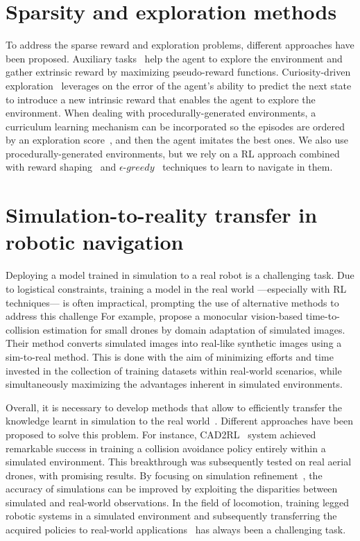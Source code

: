 \section{Sparsity and exploration methods}\label{sec:sparsity-and-exploration-methods}
To address the sparse reward and exploration problems, different approaches have been proposed.
Auxiliary tasks~\cite{jaderberg2016, ye2021} help the agent to explore the environment and gather extrinsic reward by maximizing pseudo-reward functions.
Curiosity-driven exploration~\cite{pathak2017} leverages on the error of the agent's ability to predict the next state to introduce a new intrinsic reward that enables the agent to explore the environment.
When dealing with procedurally-generated environments, a curriculum learning mechanism can be incorporated so the episodes are ordered by an exploration score~\cite{zha2020b}, and then the agent imitates the best ones.
We also use procedurally-generated environments, but we rely on a RL approach combined with reward shaping~\cite{ng1999, jestel2021} and $\epsilon\text{-}greedy$~\cite{mnih2013} techniques to learn to navigate in them.

\section{Simulation-to-reality transfer in robotic navigation}\label{sec:simulation-to-reality-transfer-in-robotic-navigation}
Deploying a model trained in simulation to a real robot is a challenging task.
Due to logistical constraints, training a model in the real world —especially with RL techniques— is often impractical, prompting the use of alternative methods to address this challenge
For example, \cite{kim2022} propose a monocular vision-based time-to-collision estimation for small drones by domain adaptation of simulated images.
Their method converts simulated images into real-like synthetic images using a sim-to-real method.
This is done with the aim of minimizing efforts and time invested in the collection of training datasets within real-world scenarios, while simultaneously maximizing the advantages inherent in simulated environments.

Overall, it is necessary to develop methods that allow to efficiently transfer the knowledge learnt in simulation to the real world~\cite{kadian2020}.
Different approaches have been proposed to solve this problem.
For instance, CAD2RL~\cite{sadeghiCAD2RLRealSingleImage2017} system achieved remarkable success in training a collision avoidance policy entirely within a simulated environment.
This breakthrough was subsequently tested on real aerial drones, with promising results.
By focusing on simulation refinement~\cite{Son2020}, the accuracy of simulations can be improved by exploiting the disparities between simulated and real-world observations.
In the field of locomotion, training legged robotic systems in a simulated environment and subsequently transferring the acquired policies to real-world applications~\cite{Hwangbo_2019, agarwal2022} has always been a challenging task.

